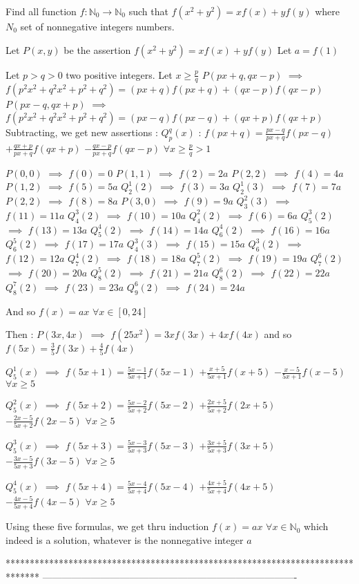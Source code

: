 \begin{solution}
	\begin{tcolorbox}Find all function ${{f: \mathbb{N}_0}\to\mathbb{N}_0}$ such that $f(x^2+y^2)=xf(x)+yf(y)$
where $N_0$ set of nonnegative integers numbers.\end{tcolorbox}
Let $P(x,y)$ be the assertion $f(x^2+y^2)=xf(x)+yf(y)$
Let $a=f(1)$

Let $p>q>0$ two positive integers. Let $x\ge \frac pq$
$P(px+q,qx-p)$ $\implies$ $f(p^2x^2+q^2x^2+p^2+q^2)=(px+q)f(px+q)+(qx-p)f(qx-p)$
$P(px-q,qx+p)$ $\implies$ $f(p^2x^2+q^2x^2+p^2+q^2)=(px-q)f(px-q)+(qx+p)f(qx+p)$
Subtracting, we get new assertions :
$Q_p^q(x)$ : $f(px+q)=\frac{px-q}{px+q}f(px-q)$ $+\frac{qx+p}{px+q}f(qx+p)$ $-\frac{qx-p}{px+q}f(qx-p)$ $\forall x\ge\frac pq>1$

$P(0,0)$ $\implies$ $f(0)=0$
$P(1,1)$ $\implies$ $f(2)=2a$
$P(2,2)$ $\implies$ $f(4)=4a$
$P(1,2)$ $\implies$ $f(5)=5a$
$Q_2^1(2)$ $\implies$ $f(3)=3a$
$Q_2^1(3)$ $\implies$ $f(7)=7a$
$P(2,2)$ $\implies$ $f(8)=8a$
$P(3,0)$ $\implies$ $f(9)=9a$
$Q_3^2(3)$ $\implies$ $f(11)=11a$
$Q_4^3(2)$ $\implies$ $f(10)=10a$
$Q_4^2(2)$ $\implies$ $f(6)=6a$
$Q_5^3(2)$ $\implies$ $f(13)=13a$
$Q_5^4(2)$ $\implies$ $f(14)=14a$
$Q_6^4(2)$ $\implies$ $f(16)=16a$
$Q_6^5(2)$ $\implies$ $f(17)=17a$
$Q_4^3(3)$ $\implies$ $f(15)=15a$
$Q_6^3(2)$ $\implies$ $f(12)=12a$
$Q_7^4(2)$ $\implies$ $f(18)=18a$
$Q_7^5(2)$ $\implies$ $f(19)=19a$
$Q_7^6(2)$ $\implies$ $f(20)=20a$
$Q_8^5(2)$ $\implies$ $f(21)=21a$
$Q_8^6(2)$ $\implies$ $f(22)=22a$
$Q_8^7(2)$ $\implies$ $f(23)=23a$
$Q_9^6(2)$ $\implies$ $f(24)=24a$

And so $f(x)=ax$ $\forall x\in[0,24]$

Then :
$P(3x,4x)$ $\implies$ $f(25x^2)=3xf(3x)+4xf(4x)$ and so $f(5x)=\frac 35f(3x)+\frac 45f(4x)$

$Q_5^1(x)$ $\implies$ $f(5x+1)=\frac{5x-1}{5x+1}f(5x-1)$ $+\frac{x+5}{5x+1}f(x+5)$ $-\frac{x-5}{5x+1}f(x-5)$ $\forall x\ge 5$

$Q_5^2(x)$ $\implies$ $f(5x+2)=\frac{5x-2}{5x+2}f(5x-2)$ $+\frac{2x+5}{5x+2}f(2x+5)$ $-\frac{2x-5}{5x+2}f(2x-5)$ $\forall x\ge 5$

$Q_5^3(x)$ $\implies$ $f(5x+3)=\frac{5x-3}{5x+3}f(5x-3)$ $+\frac{3x+5}{5x+3}f(3x+5)$ $-\frac{3x-5}{5x+3}f(3x-5)$ $\forall x\ge 5$

$Q_5^4(x)$ $\implies$ $f(5x+4)=\frac{5x-4}{5x+4}f(5x-4)$ $+\frac{4x+5}{5x+4}f(4x+5)$ $-\frac{4x-5}{5x+4}f(4x-5)$ $\forall x\ge 5$

Using these five formulas, we get thru induction $\boxed{f(x)=ax}$ $\forall x\in\mathbb N_0$ which indeed is a solution, whatever is the nonnegative integer $a$
\end{solution}
*******************************************************************************
-------------------------------------------------------------------------------

